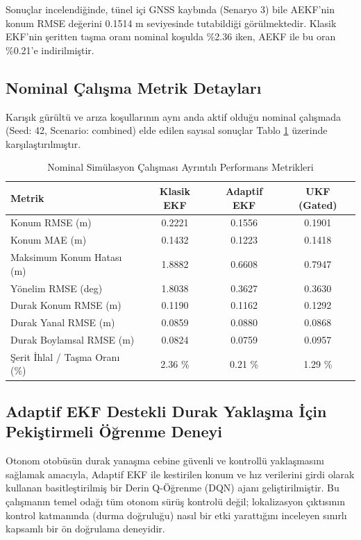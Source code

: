 ﻿\documentclass[conference]{IEEEtran}
\begin{document}
Sonuçlar incelendiğinde, tünel içi GNSS kaybında (Senaryo 3) bile AEKF'nin konum RMSE değerini 0.1514 m seviyesinde tutabildiği görülmektedir. Klasik EKF'nin şeritten taşma oranı nominal koşulda \%2.36 iken, AEKF ile bu oran \%0.21'e indirilmiştir.

\subsection{Nominal Çalışma Metrik Detayları}
Karışık gürültü ve arıza koşullarının aynı anda aktif olduğu nominal çalışmada (Seed: 42, Scenario: combined) elde edilen sayısal sonuçlar Tablo \ref{tab:nominal_results} üzerinde karşılaştırılmıştır.

\begin{table}[htbp]
\caption{Nominal Simülasyon Çalışması Ayrıntılı Performans Metrikleri}
\label{tab:nominal_results}
\centering
\footnotesize
\begin{tabular}{lccc}
\toprule
\textbf{Metrik} & \textbf{Klasik EKF} & \textbf{Adaptif EKF} & \textbf{UKF (Gated)} \\
\midrule
Konum RMSE (m) & 0.2221 & 0.1556 & 0.1901 \\
Konum MAE (m) & 0.1432 & 0.1223 & 0.1418 \\
Maksimum Konum Hatası (m) & 1.8882 & 0.6608 & 0.7947 \\
Yönelim RMSE (deg) & 1.8038 & 0.3627 & 0.3630 \\
Durak Konum RMSE (m) & 0.1190 & 0.1162 & 0.1292 \\
Durak Yanal RMSE (m) & 0.0859 & 0.0880 & 0.0868 \\
Durak Boylamsal RMSE (m) & 0.0824 & 0.0759 & 0.0957 \\
Şerit İhlal / Taşma Oranı (\%) & 2.36 \% & 0.21 \% & 1.29 \% \\
\bottomrule
\end{tabular}
\end{table}

\subsection{Adaptif EKF Destekli Durak Yaklaşma İçin Pekiştirmeli Öğrenme Deneyi}
Otonom otobüsün durak yanaşma cebine güvenli ve kontrollü yaklaşmasını sağlamak amacıyla, Adaptif EKF ile kestirilen konum ve hız verilerini girdi olarak kullanan basitleştirilmiş bir Derin Q-Öğrenme (DQN) ajanı geliştirilmiştir. Bu çalışmanın temel odağı tüm otonom sürüş kontrolü değil; lokalizasyon çıktısının kontrol katmanında (durma doğruluğu) nasıl bir etki yarattığını inceleyen sınırlı kapsamlı bir ön doğrulama deneyidir.
\end{document}

